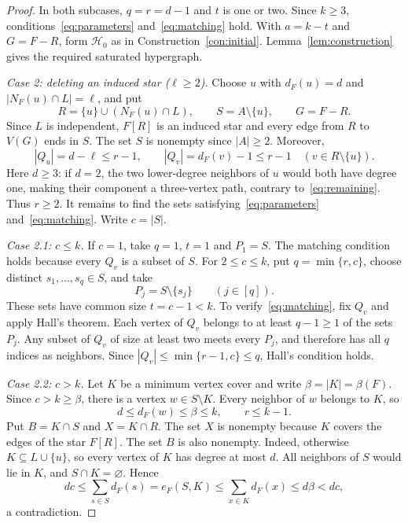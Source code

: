 \documentclass[11pt,a4paper]{article}
\numberwithin{equation}{section}
\theoremstyle{definition}
\theoremstyle{plain}
\newcommand{\HH}{\mathcal H}
\begin{document}
\begin{proof}
In both subcases, $q=r=d-1$ and $t$ is one or two. Since $k\ge3$,
conditions~\eqref{eq:parameters} and~\eqref{eq:matching} hold.
With $a=k-t$ and $G=F-R$, form $\HH_0$ as in
Construction~\ref{con:initial}. Lemma~\ref{lem:construction}
gives the required saturated hypergraph.

\smallskip
\noindent\textit{Case 2: deleting an induced star ($\ell\ge2$).}
Choose $u$ with $d_F(u)=d$ and $|N_F(u)\cap L|=\ell$, and put
\begin{equation}\label{eq:star}
 R=\{u\}\cup(N_F(u)\cap L),\qquad S=A\setminus\{u\},
 \qquad G=F-R.
\end{equation}
Since $L$ is independent, $F[R]$ is an induced star and every edge
from $R$ to $V(G)$ ends in $S$. The set $S$ is nonempty since $|A|\ge2$.
Moreover,
\begin{equation}\label{eq:Qsize}
 |Q_u|=d-\ell\le r-1,\qquad
 |Q_v|=d_F(v)-1\le r-1\quad(v\in R\setminus\{u\}).
\end{equation}
Here $d\ge3$: if $d=2$, the two lower-degree neighbors of $u$ would
both have degree one, making their component a three-vertex path,
contrary to~\eqref{eq:remaining}. Thus $r\ge2$.
It remains to find the sets satisfying~\eqref{eq:parameters}
and~\eqref{eq:matching}. Write $c=|S|$.

\smallskip
\noindent\textit{Case 2.1: $c\le k$.}
If $c=1$, take $q=1$, $t=1$ and $P_1=S$. The matching condition holds
because every $Q_v$ is a subset of $S$.
For $2\le c\le k$, put $q=\min\{r,c\}$, choose distinct
$s_1,\ldots,s_q\in S$, and take
\begin{equation}\label{eq:smallS}
 P_j=S\setminus\{s_j\}\qquad(j\in[q]).
\end{equation}
These sets have common size $t=c-1<k$.
To verify~\eqref{eq:matching}, fix $Q_v$ and apply Hall's theorem.
Each vertex of $Q_v$ belongs to at least $q-1\ge1$ of the sets $P_j$.
Any subset of $Q_v$ of size at least two meets every $P_j$, and
therefore has all $q$ indices as neighbors. Since
$|Q_v|\le\min\{r-1,c\}\le q$, Hall's condition holds.

\smallskip
\noindent\textit{Case 2.2: $c>k$.}
Let $K$ be a minimum vertex cover and write $\beta=|K|=\beta(F)$.
Since $c>k\ge\beta$, there is a vertex $w\in S\setminus K$.
Every neighbor of $w$ belongs to $K$, so
\begin{equation}\label{eq:r-bound}
 d\le d_F(w)\le\beta\le k,\qquad r\le k-1.
\end{equation}
Put $B=K\cap S$ and $X=K\cap R$.
The set $X$ is nonempty because $K$ covers the edges of the star $F[R]$.
The set $B$ is also nonempty. Indeed, otherwise
$K\subseteq L\cup\{u\}$, so every vertex of $K$ has degree at most $d$.
All neighbors of $S$ would lie in $K$, and $S\cap K=\varnothing$.
Hence
\[
 dc\le\sum_{s\in S}d_F(s)
 =e_F(S,K)\le\sum_{x\in K}d_F(x)\le d\beta<dc,
\]
a contradiction.


\end{proof}
\end{document}
